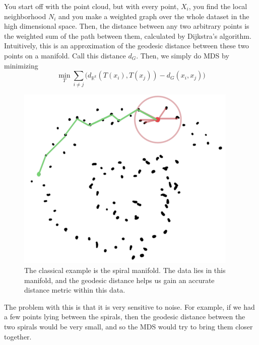     \begin{definition}[Isomap]
      You start off with the point cloud, but with every point, $X_i$, you find the local neighborhood $N_i$ and you make a weighted graph over the whole dataset in the high dimensional space. Then, the distance between any two arbitrary points is the weighted sum of the path between them, calculated by Dijkstra's algorithm. Intuitively, this is an approximation of the geodesic distance between these two points on a manifold. Call this distance $d_G$. Then, we simply do MDS by minimizing 
      \begin{equation}
        \min_{T} \sum_{i \neq j} \big( d_{\mathbb{R}^k}(T(x_i), T(x_j)) - d_G(x_i, x_j) \big)
      \end{equation}

      \begin{figure}[H]
        \centering 
        \includegraphics[scale=0.4]{img/isomap.png}
        \caption{The classical example is the spiral manifold. The data lies in this manifold, and the geodesic distance helps us gain an accurate distance metric within this data. } 
        \label{fig:isomap}
      \end{figure}
    \end{definition}

    The problem with this is that it is very sensitive to noise. For example, if we had a few points lying between the spirals, then the geodesic distance between the two spirals would be very small, and so the MDS would try to bring them closer together.  

